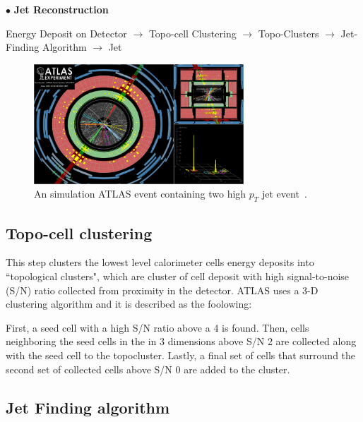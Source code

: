 $\bullet$ \textbf{Jet Reconstruction}

Energy Deposit on Detector  $\rightarrow$  Topo-cell Clustering $\rightarrow$  Topo-Clusters $\rightarrow$  Jet-Finding Algorithm $\rightarrow$ Jet


\begin{figure}[!htb]
    \begin{center}
        \includegraphics[width=0.7\textwidth]{figures/common_ana/JetEvent}
        \caption{        
            An simulation ATLAS event containing two high $p_{T}$ jet event~\cite{jetEvent}.
        }
        \label{fig:jetEvent}
    \end{center}
\end{figure}

% 
\subsection*{Topo-cell clustering}
\label{Topocell clustering}
This step clusters the lowest level calorimeter cells energy deposits into ``topological clusters", which are cluster of cell deposit with high signal-to-noise (S/N) ratio collected from proximity in the detector. ATLAS uses a 3-D clustering algorithm and it is described as the foolowing:

First, a seed cell with a high S/N ratio above a 4 is found. Then, cells neighboring the seed cells in the in 3 dimensions above S/N 2 are collected along with the seed cell to the topocluster. Lastly, a final set of cells that surround the second set of collected cells above S/N 0  are added to the cluster. 

\subsection*{Jet Finding algorithm}
\label{sec:JetFinding}

